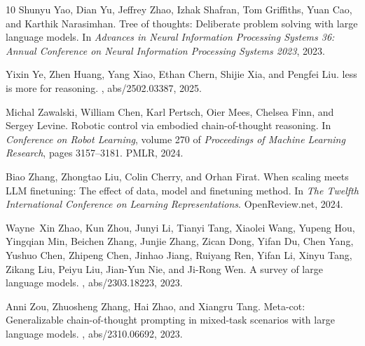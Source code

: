 \documentclass{article}
\begin{document}
{\begin{thebibliography}{10}
        Shunyu Yao, Dian Yu, Jeffrey Zhao, Izhak Shafran, Tom Griffiths, Yuan Cao, and Karthik Narasimhan.
        \newblock Tree of thoughts: Deliberate problem solving with large language models.
        \newblock In {\em Advances in Neural Information Processing Systems 36: Annual Conference on Neural Information Processing Systems 2023}, 2023.
        
        Yixin Ye, Zhen Huang, Yang Xiao, Ethan Chern, Shijie Xia, and Pengfei Liu.
         less is more for reasoning.
        , abs/2502.03387, 2025.
        
        Michal Zawalski, William Chen, Karl Pertsch, Oier Mees, Chelsea Finn, and Sergey Levine.
        \newblock Robotic control via embodied chain-of-thought reasoning.
        \newblock In {\em Conference on Robot Learning}, volume 270 of {\em Proceedings of Machine Learning Research}, pages 3157--3181. {PMLR}, 2024.
        
        Biao Zhang, Zhongtao Liu, Colin Cherry, and Orhan Firat.
        \newblock When scaling meets {LLM} finetuning: The effect of data, model and finetuning method.
        \newblock In {\em The Twelfth International Conference on Learning Representations}. OpenReview.net, 2024.
        
        Wayne~Xin Zhao, Kun Zhou, Junyi Li, Tianyi Tang, Xiaolei Wang, Yupeng Hou, Yingqian Min, Beichen Zhang, Junjie Zhang, Zican Dong, Yifan Du, Chen Yang, Yushuo Chen, Zhipeng Chen, Jinhao Jiang, Ruiyang Ren, Yifan Li, Xinyu Tang, Zikang Liu, Peiyu Liu, Jian{-}Yun Nie, and Ji{-}Rong Wen.
        \newblock A survey of large language models.
        , abs/2303.18223, 2023.
        
        Anni Zou, Zhuosheng Zhang, Hai Zhao, and Xiangru Tang.
        \newblock Meta-cot: Generalizable chain-of-thought prompting in mixed-task scenarios with large language models.
        , abs/2310.06692, 2023.
        
        \end{thebibliography}
        
}
\newpage



\end{document}
